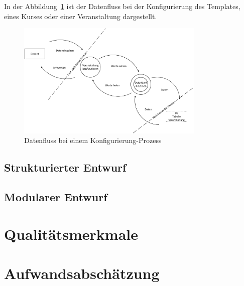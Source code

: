 \begin{appendix}
  
  In der Abbildung~\ref{fig:config} ist der Datenfluss bei der Konfigurierung des Templates, eines Kurses oder einer Veranstaltung dargestellt.
  
      \begin{figure}[ht]
    \centering
    \includegraphics[width=0.8\textwidth]{./img/dfd_config}
    \caption{Datenfluss bei einem Konfigurierung-Prozess}
    \label{fig:config}
    \end{figure}
    \clearpage
    
	
	\subsection{Strukturierter Entwurf}
	
	\subsection{Modularer Entwurf}
	
  \section{Qualitätsmerkmale\label{sec:quali}}
  \clearpage
  
  
  \section{Aufwandsabschätzung}
  
  
  

\end{appendix}
